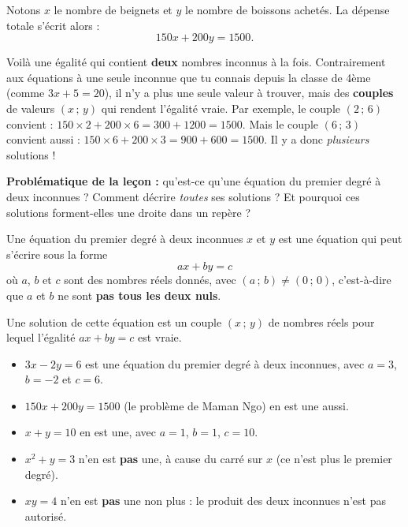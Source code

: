 \documentclass[11pt]{article}
\newcommand{\cle}[1]{{\popxbold\color{popdark}#1}}
\newcounter{popsec}
\newcounter{popsub}
\newcommand{\courssub}[1]{%
  \stepcounter{popsub}%
  \par\vspace{9pt}\noindent{\popxbold\fontsize{11.5}{13}\selectfont\color{popink}{\color{poporange}\thepopsec.\thepopsub}\hspace{6pt}#1}\par\nopagebreak\vspace{4pt}
}
\begin{document}
Notons $x$ le nombre de beignets et $y$ le nombre de boissons achetés. La dépense totale s'écrit alors :
\[ 150x + 200y = 1500. \]

Voilà une égalité qui contient \textbf{deux} nombres inconnus à la fois. Contrairement aux équations à une seule inconnue que tu connais depuis la classe de 4ème (comme $3x+5=20$), il n'y a plus une seule valeur à trouver, mais des \textbf{couples} de valeurs $(x\,;\,y)$ qui rendent l'égalité vraie. Par exemple, le couple $(2\,;\,6)$ convient : $150\times 2 + 200\times 6 = 300 + 1200 = 1500$. Mais le couple $(6\,;\,3)$ convient aussi : $150\times 6 + 200\times 3 = 900 + 600 = 1500$. Il y a donc \emph{plusieurs} solutions !

\textbf{Problématique de la leçon :} qu'est-ce qu'une équation du premier degré à deux inconnues ? Comment décrire \emph{toutes} ses solutions ? Et pourquoi ces solutions forment-elles une droite dans un repère ?

\courssub{Définition et vocabulaire}

\begin{definition}
Une \cle{équation du premier degré à deux inconnues} $x$ et $y$ est une équation qui peut s'écrire sous la forme
\[ ax + by = c \]
où $a$, $b$ et $c$ sont des nombres réels donnés, avec $(a\,;\,b) \neq (0\,;\,0)$, c'est-à-dire que $a$ et $b$ ne sont \textbf{pas tous les deux nuls}.

Une \cle{solution} de cette équation est un couple $(x\,;\,y)$ de nombres réels pour lequel l'égalité $ax+by=c$ est vraie.
\end{definition}

\begin{exemplebox}
\begin{itemize}
\item $3x - 2y = 6$ est une équation du premier degré à deux inconnues, avec $a=3$, $b=-2$ et $c=6$.
\item $150x + 200y = 1500$ (le problème de Maman Ngo) en est une aussi.
\item $x + y = 10$ en est une, avec $a=1$, $b=1$, $c=10$.
\item $x^2 + y = 3$ n'en est \textbf{pas} une, à cause du carré sur $x$ (ce n'est plus le premier degré).
\item $xy = 4$ n'en est \textbf{pas} une non plus : le produit des deux inconnues n'est pas autorisé.
\end{itemize}
\end{exemplebox}
\end{document}
